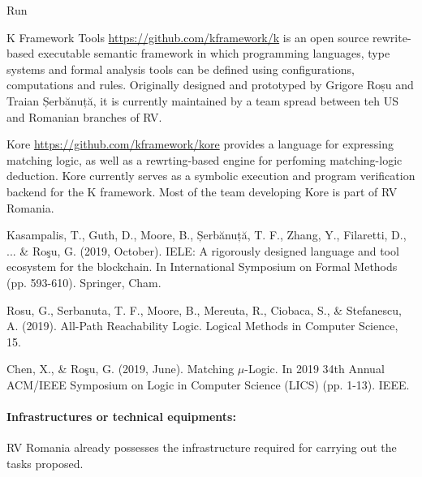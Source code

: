 \begin{sitedescription}{Run}
\begin{compactitem}
\item K Framework Tools \url{https://github.com/kframework/k} is an open source
 rewrite-based executable semantic framework in which programming languages,
 type systems and formal analysis tools can be defined using configurations,
 computations and rules. Originally designed and prototyped by Grigore Roșu and 
 Traian Șerbănuță, it is currently maintained by a team spread between teh US and 
 Romanian branches of RV. 
\item Kore \url{https://github.com/kframework/kore} provides a language for
expressing matching logic, as well as a rewrting-based engine for perfoming 
matching-logic deduction.  Kore currently serves as a symbolic execution and 
program verification backend for the K framework. Most of the team developing Kore
is part of RV Romania.
\item Kasampalis, T., Guth, D., Moore, B., Șerbănuță, T. F., Zhang, Y., Filaretti, D., ... \& Roşu, G. (2019, October). IELE: A rigorously designed language and tool ecosystem for the blockchain. In International Symposium on Formal Methods (pp. 593-610). Springer, Cham.
\item Rosu, G., Serbanuta, T. F., Moore, B., Mereuta, R., Ciobaca, S., \& Stefanescu, A. (2019). All-Path Reachability Logic. Logical Methods in Computer Science, 15.
\item Chen, X., \& Roşu, G. (2019, June). Matching $\mu$-Logic. In 2019 34th Annual ACM/IEEE Symposium on Logic in Computer Science (LICS) (pp. 1-13). IEEE.
\end{compactitem}




\paragraph{Infrastructures or technical equipments:}

RV Romania already possesses the infrastructure required for carrying out the tasks proposed.


\end{sitedescription}
